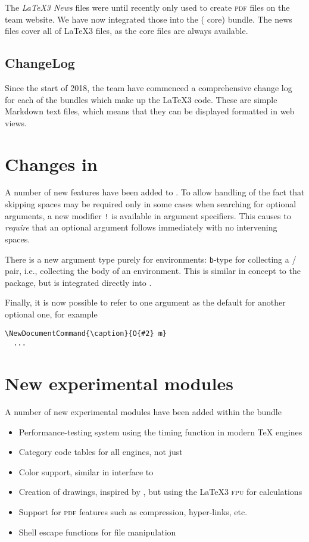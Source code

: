\documentclass{ltnews}
\begin{document}
The \emph{\LaTeX3 News} files were until recently only used to create
\textsc{pdf} files on the team website. We have now integrated those into the
 ( core) bundle. The news files cover all of \LaTeX3
files, as the core files are always available.

\subsection{ChangeLog}

Since the start of 2018, the team have commenced a comprehensive
change log for each of the bundles which make up the \LaTeX3 code.
These are simple Markdown text files, which means that they can be displayed
formatted in web views.

\section{Changes in }

A number of new features have been added to . To allow
handling of the fact that skipping spaces may be required only in
some cases when searching for optional arguments, a new modifier
\texttt{!} is available in argument specifiers. This causes
 to \emph{require} that an optional argument follows
immediately with no intervening spaces.

There is a new argument type purely for environments: \texttt{b}-type
for collecting a / pair, i.e., collecting the body of
an environment. This is similar in concept to the  package,
but is integrated directly into .

Finally, it is now possible to refer to one argument as the
default for another optional one, for example
\begin{verbatim}
\NewDocumentCommand{\caption}{O{#2} m}
  ...
\end{verbatim}

\section{New experimental modules}

A number of new experimental modules have been added within the
 bundle
\begin{itemize}
  \item {} Performance-testing system using the timing
    function in modern \TeX{} engines
  \item {} Category code tables for all engines, not
    just 
  \item {} Color support, similar in interface to 
  \item {} Creation of drawings, inspired by , but
    using the \LaTeX3 \textsc{fpu} for calculations
  \item {} Support for \textsc{pdf} features such as compression,
    hyper-links, etc.
  \item {} Shell escape functions for file manipulation
\end{itemize}
\end{document}
